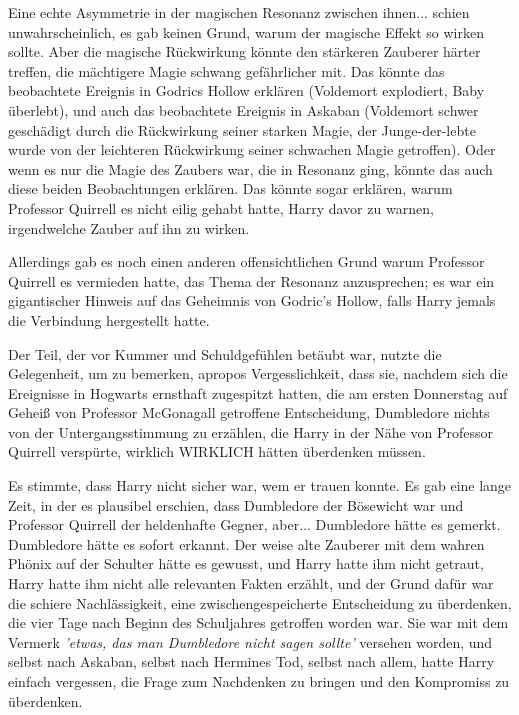 {Eine echte Asymmetrie in der magischen Resonanz zwischen ihnen... schien unwahrscheinlich, es gab keinen Grund, warum der magische Effekt so wirken sollte. Aber die magische Rückwirkung könnte den stärkeren Zauberer härter treffen, die mächtigere Magie schwang gefährlicher mit. Das könnte das beobachtete Ereignis in Godrics Hollow erklären (Voldemort explodiert, Baby überlebt), und auch das beobachtete Ereignis in Askaban (Voldemort schwer geschädigt durch die Rückwirkung seiner starken Magie, der Junge-der-lebte wurde von der leichteren Rückwirkung seiner schwachen Magie getroffen). Oder wenn es nur die Magie des Zaubers war, die in Resonanz ging, könnte das auch diese beiden Beobachtungen erklären. Das könnte sogar erklären, warum Professor Quirrell es nicht eilig gehabt hatte, Harry davor zu warnen, irgendwelche Zauber auf ihn zu wirken.

Allerdings gab es noch einen anderen offensichtlichen Grund warum Professor Quirrell es vermieden hatte, das Thema der Resonanz anzusprechen; es war ein gigantischer Hinweis auf das Geheimnis von Godric's Hollow, falls Harry jemals die Verbindung hergestellt hatte.

Der Teil, der vor Kummer und Schuldgefühlen betäubt war, nutzte die Gelegenheit, um zu bemerken, apropos Vergesslichkeit, dass sie, nachdem sich die Ereignisse in Hogwarts ernsthaft zugespitzt hatten, die am ersten Donnerstag auf Geheiß von Professor McGonagall getroffene Entscheidung, Dumbledore nichts von der Untergangsstimmung zu erzählen, die Harry in der Nähe von Professor Quirrell verspürte, wirklich WIRKLICH hätten überdenken müssen.

Es stimmte, dass Harry nicht sicher war, wem er trauen konnte. Es gab eine lange Zeit, in der es plausibel erschien, dass Dumbledore der Bösewicht war und Professor Quirrell der heldenhafte Gegner, aber... Dumbledore hätte es gemerkt. Dumbledore hätte es sofort erkannt. Der weise alte Zauberer mit dem wahren Phönix auf der Schulter hätte es gewusst, und Harry hatte ihm nicht getraut, Harry hatte ihm nicht alle relevanten Fakten erzählt, und der Grund dafür war die schiere Nachlässigkeit, eine zwischengespeicherte Entscheidung zu überdenken, die vier Tage nach Beginn des Schuljahres getroffen worden war. Sie war mit dem Vermerk \emph{'etwas, das man Dumbledore nicht sagen sollte'} versehen worden, und selbst nach Askaban, selbst nach Hermines Tod, selbst nach allem, hatte Harry einfach vergessen, die Frage zum Nachdenken zu bringen und den Kompromiss zu überdenken.

}
